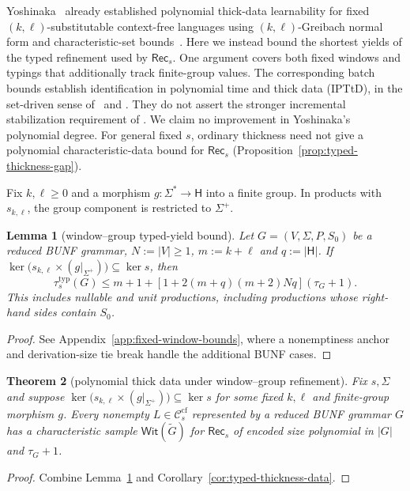 \documentclass[11pt,a4paper]{article}
\newtheorem{theorem}{Theorem}[section]
\newtheorem{lemma}[theorem]{Lemma}
\theoremstyle{remark}
\theoremstyle{plain}
\newcommand{\WitnessSet}{\mathsf{Wit}}
\newcommand{\cf}{\mathrm{cf}}
\newcommand{\Ccf}[1]{\mathcal C_{#1}^{\cf}}
\begin{document}
Yoshinaka~\cite[Theorem~1]{yoshinaka2008} already established
polynomial thick-data learnability for fixed $(k,\ell)$-substitutable
context-free languages using $(k,\ell)$-Greibach normal form
and characteristic-set bounds~\cite[Lemmas~2 and~7]{yoshinaka2008}.
Here we instead bound the shortest yields of the typed refinement used by
$\mathsf{Rec}_s$.  One argument covers both fixed windows and
typings that additionally track finite-group values.
The corresponding batch bounds establish
identification in polynomial time and thick data (IPTtD),
in the set-driven sense of~\cite{yoshinaka2008} and
\cite[Definition~2.12]{eyraud-heinz-yoshinaka2016}.
They do not assert the stronger incremental stabilization requirement
of \cite[Definition~2.5]{eyraud-heinz-yoshinaka2016}.
We claim no improvement in Yoshinaka's polynomial degree.
For general fixed $s$, ordinary thickness need not give a polynomial
characteristic-data bound for $\mathsf{Rec}_s$
(Proposition~\ref{prop:typed-thickness-gap}).

Fix $k,\ell\ge0$ and a morphism $g:\Sigma^*\to\mathsf H$
into a finite group. In products with $s_{k,\ell}$,
the group component is restricted to $\Sigma^+$.
\begin{lemma}[window--group typed-yield bound]
\label{lem:window-typed-yield}
Let $G=(V,\Sigma,P,S_0)$ be a reduced BUNF grammar,
$N:=|V|\ge1$, $m:=k+\ell$ and $q:=|\mathsf H|$.
If $\ker\bigl(s_{k,\ell}\times(g|_{\Sigma^+})\bigr)
 \subseteq\ker s$, then
\[
 \tau_s^{\mathrm{typ}}(G)
 \le m+1+[1+2(m+q)(m+2)Nq](\tau_G+1).
\]
This includes nullable and unit productions, including
productions whose right-hand sides contain $S_0$.
\end{lemma}
\begin{proof}
See Appendix~\ref{app:fixed-window-bounds}, where a
nonemptiness anchor and derivation-size tie break
handle the additional BUNF cases.
\end{proof}

\begin{theorem}[polynomial thick data under window--group refinement]
\label{thm:window-thick}
Fix $s,\Sigma$ and suppose
$\ker\bigl(s_{k,\ell}\times(g|_{\Sigma^+})\bigr)
 \subseteq\ker s$
for some fixed $k,\ell$ and finite-group morphism $g$.
Every nonempty $L\in\Ccf{s}$ represented by a
reduced BUNF grammar $G$ has a characteristic sample
$\WitnessSet(\widetilde G)$ for $\mathsf{Rec}_s$
of encoded size polynomial in $|G|$ and $\tau_G+1$.
\end{theorem}
\begin{proof}
Combine Lemma~\ref{lem:window-typed-yield} and
Corollary~\ref{cor:typed-thickness-data}.
\end{proof}
\end{document}
